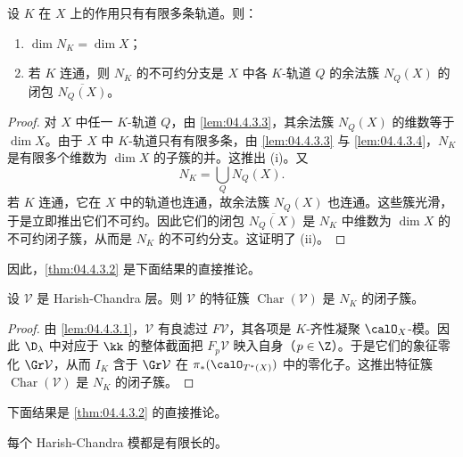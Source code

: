 \begin{corollary}\label{cor:04.4.3.5}
设 $K$ 在 $X$ 上的作用只有有限多条轨道。则：
\begin{enumerate}[label=(\roman*)]
\item $\dim N_K=\dim X$；
\item 若 $K$ 连通，则 $N_K$ 的不可约分支是 $X$ 中各 $K$-轨道 $Q$ 的余法簇 $N_Q(X)$ 的闭包 $\overline{N_Q(X)}$。
\end{enumerate}
\end{corollary}

\begin{proof}
对 $X$ 中任一 $K$-轨道 $Q$，由 \ref{lem:04.4.3.3}，其余法簇 $N_Q(X)$ 的维数等于 $\dim X$。由于 $X$ 中 $K$-轨道只有有限多条，由 \ref{lem:04.4.3.3} 与 \ref{lem:04.4.3.4}，$N_K$ 是有限多个维数为 $\dim X$ 的子簇的并。这推出 (i)。又
$$N_K=\bigcup_Q N_Q(X).$$
若 $K$ 连通，它在 $X$ 中的轨道也连通，故余法簇 $N_Q(X)$ 也连通。这些簇光滑，于是立即推出它们不可约。因此它们的闭包 $\overline{N_Q(X)}$ 是 $N_K$ 中维数为 $\dim X$ 的不可约闭子簇，从而是 $N_K$ 的不可约分支。这证明了 (ii)。
\end{proof}

因此，\ref{thm:04.4.3.2} 是下面结果的直接推论。

\begin{proposition}\label{prop:04.4.3.6}
设 $\mathcal{V}$ 是 Harish-Chandra 层。则 $\mathcal{V}$ 的特征簇 $\operatorname{Char}(\mathcal{V})$ 是 $N_K$ 的闭子簇。
\end{proposition}

\begin{proof}
由 \ref{lem:04.4.3.1}，$\mathcal{V}$ 有良滤过 $F\mathcal{V}$，其各项是 $K$-齐性凝聚 $\calO_X$-模。因此 $\D_\lambda$ 中对应于 $\kk$ 的整体截面把 $F_p\mathcal{V}$ 映入自身（$p\in\Z$）。于是它们的象征零化 $\Gr\mathcal{V}$，从而 $I_K$ 含于 $\Gr\mathcal{V}$ 在 $\pi_*(\calO_{T^*(X)})$ 中的零化子。这推出特征簇 $\operatorname{Char}(\mathcal{V})$ 是 $N_K$ 的闭子簇。
\end{proof}

下面结果是 \ref{thm:04.4.3.2} 的直接推论。

\begin{theorem}\label{thm:04.4.3.7}
每个 Harish-Chandra 模都是有限长的。
\end{theorem}

